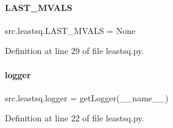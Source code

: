 \paragraph{\texorpdfstring{L\+A\+S\+T\+\_\+\+M\+V\+A\+LS}{LAST\_MVALS}}
{\footnotesize\ttfamily src.\+leastsq.\+L\+A\+S\+T\+\_\+\+M\+V\+A\+LS = None}



Definition at line 29 of file leastsq.\+py.

\mbox{\label{namespacesrc_1_1leastsq_a478b7f47722f293515ae13ef0e9fd608}} 
\paragraph{\texorpdfstring{logger}{logger}}
{\footnotesize\ttfamily src.\+leastsq.\+logger = get\+Logger(\+\_\+\+\_\+name\+\_\+\+\_\+)}



Definition at line 22 of file leastsq.\+py.

